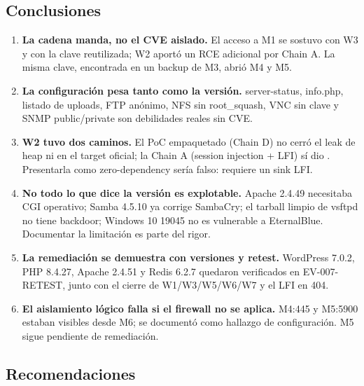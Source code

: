 \documentclass[11pt,a4paper]{article}
\newcommand{\code}[1]{\texttt{\detokenize{#1}}}
\begin{document}
\subsection{Conclusiones}

\begin{enumerate}
    \item \textbf{La cadena manda, no el CVE aislado.} El acceso a M1 se sostuvo con W3 y con la clave reutilizada; W2 aportó un RCE adicional por Chain A. La misma clave, encontrada en un backup de M3, abrió M4 y M5.
    \item \textbf{La configuración pesa tanto como la versión.} server-status, info.php, listado de uploads, FTP anónimo, NFS sin root\_squash, VNC sin clave y SNMP public/private son debilidades reales sin CVE.
    \item \textbf{W2 tuvo dos caminos.} El PoC empaquetado (Chain D) no cerró el leak de heap ni en el target oficial; la Chain A (session injection + LFI) sí dio \code{uid=33(www-data)}. Presentarla como zero-dependency sería falso: requiere un sink LFI.
    \item \textbf{No todo lo que dice la versión es explotable.} Apache 2.4.49 necesitaba CGI operativo; Samba 4.5.10 ya corrige SambaCry; el tarball limpio de vsftpd no tiene backdoor; Windows 10 19045 no es vulnerable a EternalBlue. Documentar la limitación es parte del rigor.
    \item \textbf{La remediación se demuestra con versiones y retest.} WordPress 7.0.2, PHP 8.4.27, Apache 2.4.51 y Redis 6.2.7 quedaron verificados en EV-007-RETEST, junto con el cierre de W1/W3/W5/W6/W7 y el LFI en 404.
    \item \textbf{El aislamiento lógico falla si el firewall no se aplica.} M4:445 y M5:5900 estaban visibles desde M6; se documentó como hallazgo de configuración. M5 sigue pendiente de remediación.
\end{enumerate}

\subsection{Recomendaciones}
\end{document}
